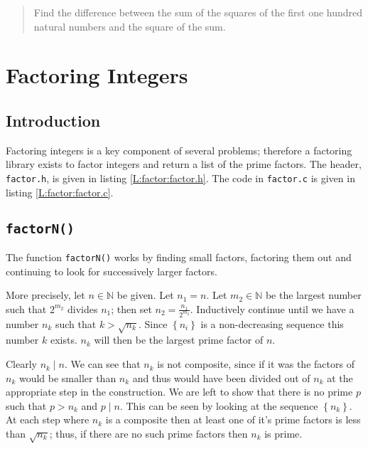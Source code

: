 \documentclass[oneside,12pt]{book}   	%
\newcounter{ex}
\newcounter{pr}
\theoremstyle{definition}
\newcommand{\set}[1]{\left\{#1\right\}}
\begin{document}
\begin{spacing}{1.618}
\begin{quote}
			Find the difference between the sum of the squares of the first one hundred natural numbers and the square of the sum. 
		\end{quote}
\appendix
	\chapter{Factoring Integers}\label{C:Factoring}
		\section{Introduction}
		
			Factoring integers is a key component of several problems; therefore a factoring library exists to factor integers and return a list of the prime factors. The header, \texttt{factor.h}, is given in listing \ref{L:factor:factor.h}.  The code in \texttt{factor.c} is given in listing \ref{L:factor:factor.c}. 
		
		\section{\texttt{factorN()}}
		
			The function \texttt{factorN()} works by finding small factors, factoring them out and continuing to look for successively larger factors.
		
			More precisely, let $n\in \mathbb{N}$ be given. Let $n_1=n$. Let $m_2\in\mathbb{N}$ be the largest number such that $2^{m_2}$ divides $n_1$; then set $n_2=\frac{n_1}{2^{m_2}}$. Inductively continue until we have a number $n_k$ such that $k>\sqrt{n_k}$. Since $\set{n_i}$ is a non-decreasing sequence this number $k$ exists. $n_k$ will then be the largest prime factor of $n$. 
			
			Clearly $n_k\mid n$. We can see that $n_k$ is not composite, since if it was the factors of $n_k$ would be smaller than $n_k$ and thus would have been divided out of $n_k$ at the appropriate step in the construction. We are left to show that there is no prime $p$ such that $p>n_k$ and $p\mid n$. This can be seen by looking at the sequence $\set{n_k}$. At each step where $n_k$ is a composite then at least one of it's prime factors is less than $\sqrt{n_k}$; thus, if there are no such prime factors then $n_k$ is prime. 

		

		

	
	
		
	\printindex
\end{spacing}
\end{document}
